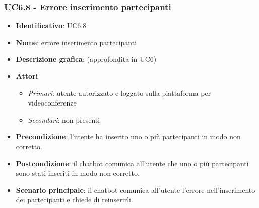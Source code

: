 \subsubsection{UC6.8 - Errore inserimento partecipanti}
\begin{itemize}
    \item \textbf{Identificativo}: UC6.8
    \item \textbf{Nome}: errore inserimento partecipanti
    \item \textbf{Descrizione grafica}: (approfondita in UC6)
    \item \textbf{Attori}
 \begin{itemize} 
    \item \textit{Primari}: utente autorizzato e loggato sulla piattaforma per videoconferenze
    \item \textit{Secondari}: non presenti
 \end{itemize}
 \item \textbf{Precondizione}: l'utente ha inserito uno o più partecipanti in modo non corretto.
 \item \textbf{Postcondizione}: il chatbot comunica all'utente che uno o più partecipanti sono stati inseriti in modo non corretto.
 \item \textbf{Scenario principale}: il chatbot comunica all'utente l'errore nell'inserimento dei partecipanti e chiede di reinserirli.
\end{itemize}
\newpage